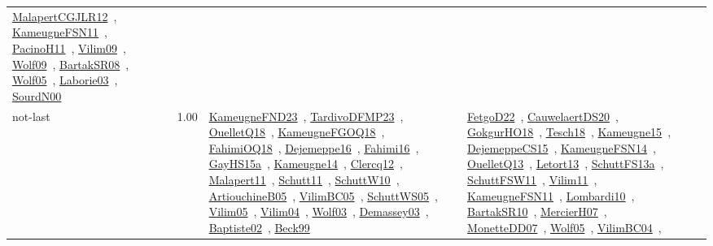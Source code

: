 {\begin{longtable}{p{3cm}r>{\raggedright\arraybackslash}p{6cm}>{\raggedright\arraybackslash}p{6cm}>{\raggedright\arraybackslash}p{8cm}}
\href{../works/MalapertCGJLR12.pdf}{MalapertCGJLR12}~\cite{MalapertCGJLR12}, \href{../works/KameugneFSN11.pdf}{KameugneFSN11}~\cite{KameugneFSN11}, \href{../works/PacinoH11.pdf}{PacinoH11}~\cite{PacinoH11}, \href{../works/Vilim09.pdf}{Vilim09}~\cite{Vilim09}, \href{../works/Wolf09.pdf}{Wolf09}~\cite{Wolf09}, \href{../works/BartakSR08.pdf}{BartakSR08}~\cite{BartakSR08}, \href{../works/Wolf05.pdf}{Wolf05}~\cite{Wolf05}, \href{../works/Laborie03.pdf}{Laborie03}~\cite{Laborie03}, \href{../works/SourdN00.pdf}{SourdN00}~\cite{SourdN00}\\
\index{not-last}\index{Algorithms!not-last}not-last &  1.00 & \href{../works/KameugneFND23.pdf}{KameugneFND23}~\cite{KameugneFND23}, \href{../works/TardivoDFMP23.pdf}{TardivoDFMP23}~\cite{TardivoDFMP23}, \href{../works/OuelletQ18.pdf}{OuelletQ18}~\cite{OuelletQ18}, \href{../works/KameugneFGOQ18.pdf}{KameugneFGOQ18}~\cite{KameugneFGOQ18}, \href{../works/FahimiOQ18.pdf}{FahimiOQ18}~\cite{FahimiOQ18}, \href{../works/Dejemeppe16.pdf}{Dejemeppe16}~\cite{Dejemeppe16}, \href{../works/Fahimi16.pdf}{Fahimi16}~\cite{Fahimi16}, \href{../works/GayHS15a.pdf}{GayHS15a}~\cite{GayHS15a}, \href{../works/Kameugne14.pdf}{Kameugne14}~\cite{Kameugne14}, \href{../works/Clercq12.pdf}{Clercq12}~\cite{Clercq12}, \href{../works/Malapert11.pdf}{Malapert11}~\cite{Malapert11}, \href{../works/Schutt11.pdf}{Schutt11}~\cite{Schutt11}, \href{../works/SchuttW10.pdf}{SchuttW10}~\cite{SchuttW10}, \href{../works/ArtiouchineB05.pdf}{ArtiouchineB05}~\cite{ArtiouchineB05}, \href{../works/VilimBC05.pdf}{VilimBC05}~\cite{VilimBC05}, \href{../works/SchuttWS05.pdf}{SchuttWS05}~\cite{SchuttWS05}, \href{../works/Vilim05.pdf}{Vilim05}~\cite{Vilim05}, \href{../works/Vilim04.pdf}{Vilim04}~\cite{Vilim04}, \href{../works/Wolf03.pdf}{Wolf03}~\cite{Wolf03}, \href{../works/Demassey03.pdf}{Demassey03}~\cite{Demassey03}, \href{../works/Baptiste02.pdf}{Baptiste02}~\cite{Baptiste02}, \href{../works/Beck99.pdf}{Beck99}~\cite{Beck99} & \href{../works/FetgoD22.pdf}{FetgoD22}~\cite{FetgoD22}, \href{../works/CauwelaertDS20.pdf}{CauwelaertDS20}~\cite{CauwelaertDS20}, \href{../works/GokgurHO18.pdf}{GokgurHO18}~\cite{GokgurHO18}, \href{../works/Tesch18.pdf}{Tesch18}~\cite{Tesch18}, \href{../works/Kameugne15.pdf}{Kameugne15}~\cite{Kameugne15}, \href{../works/DejemeppeCS15.pdf}{DejemeppeCS15}~\cite{DejemeppeCS15}, \href{../works/KameugneFSN14.pdf}{KameugneFSN14}~\cite{KameugneFSN14}, \href{../works/OuelletQ13.pdf}{OuelletQ13}~\cite{OuelletQ13}, \href{../works/Letort13.pdf}{Letort13}~\cite{Letort13}, \href{../works/SchuttFS13a.pdf}{SchuttFS13a}~\cite{SchuttFS13a}, \href{../works/SchuttFSW11.pdf}{SchuttFSW11}~\cite{SchuttFSW11}, \href{../works/Vilim11.pdf}{Vilim11}~\cite{Vilim11}, \href{../works/KameugneFSN11.pdf}{KameugneFSN11}~\cite{KameugneFSN11}, \href{../works/Lombardi10.pdf}{Lombardi10}~\cite{Lombardi10}, \href{../works/BartakSR10.pdf}{BartakSR10}~\cite{BartakSR10}, \href{../works/MercierH07.pdf}{MercierH07}~\cite{MercierH07}, \href{../works/MonetteDD07.pdf}{MonetteDD07}~\cite{MonetteDD07}, \href{../works/Wolf05.pdf}{Wolf05}~\cite{Wolf05}, \href{../works/VilimBC04.pdf}{VilimBC04}~\cite{VilimBC04}, 
\end{longtable}}
